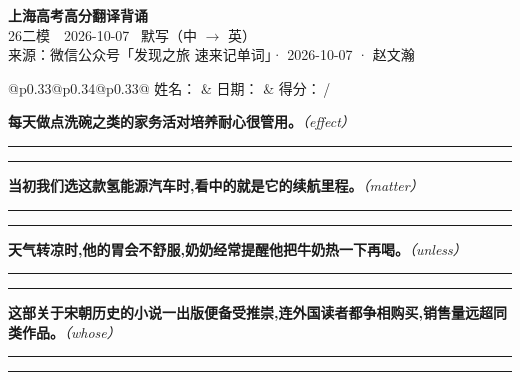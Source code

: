 \documentclass[11pt,a4paper]{article}
\newcommand{\num}[1]{\makebox[1.9em][r]{#1.}\hspace{0.3em}}
\newcommand{\wline}{\noindent\rule{\linewidth}{0.4pt}}
\newcommand{\prompt}[1]{\emph{\textcolor{tipblue}{\small（#1）}}}
\begin{document}
\pagestyle{plain}
\begin{center}
{\LARGE\bfseries 上海高考高分翻译背诵 }\\[0.25em]
{\large 26二模　2026-10-07 \quad\ 默写（中 $\to$ 英）}\\[0.35em]
{\footnotesize 来源：微信公众号「发现之旅 速来记单词」· 2026-10-07 · 赵文瀚}
\end{center}

\vspace{0.4em}
\noindent\begin{tabular}{@{}p{0.33\textwidth}@{}p{0.34\textwidth}@{}p{0.33\textwidth}@{}}
姓名：\underline{\hspace{2.0cm}} & 日期：\underline{\hspace{2.0cm}} & 得分：\underline{\hspace{1.4cm}}\,/ \\
\end{tabular}

\vspace{0.5em}

\vspace{0.8em}
\num{1}\textbf{每天做点洗碗之类的家务活对培养耐心很管用。}\prompt{effect}

\vspace{0.3em}

\wline\vspace{0.3em}
\wline

\num{2}\textbf{当初我们选这款氢能源汽车时,看中的就是它的续航里程。}\prompt{matter}

\vspace{0.3em}

\wline\vspace{0.3em}
\wline

\num{3}\textbf{天气转凉时,他的胃会不舒服,奶奶经常提醒他把牛奶热一下再喝。}\prompt{unless}

\vspace{0.3em}

\wline\vspace{0.3em}
\wline

\num{4}\textbf{这部关于宋朝历史的小说一出版便备受推崇,连外国读者都争相购买,销售量远超同类作品。}\prompt{whose}

\vspace{0.3em}

\wline\vspace{0.3em}
\wline
\end{document}
